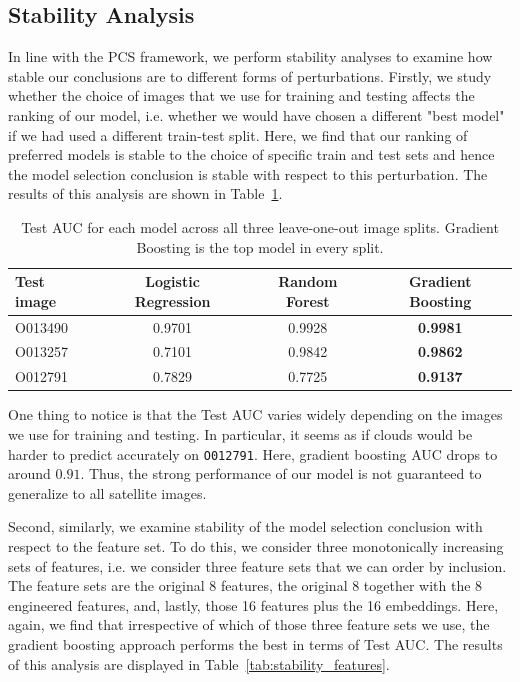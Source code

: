 \documentclass[10pt,letterpaper]{article}
\begin{document}
\subsection{Stability Analysis}

In line with the PCS framework, we perform stability analyses to examine how stable our conclusions are to different forms of perturbations. Firstly, we study whether the choice of images that we use for training and testing affects the ranking of our model, i.e. whether we would have chosen a different "best model" if we had used a different train-test split. Here, we find that our ranking of preferred models is stable to the choice of specific train and test sets and hence the model selection conclusion is stable with respect to this perturbation. The results of this analysis are shown in Table~\ref{tab:stability_loo}.

\begin{table}[htbp]
\centering
\small
\caption{Test AUC for each model across all three leave-one-out image splits. Gradient Boosting is the top model in every split.}
\label{tab:stability_loo}
\begin{tabular}{lccc}
\toprule
Test image & Logistic Regression & Random Forest & Gradient Boosting \\
\midrule
O013490 & 0.9701 & 0.9928 & \textbf{0.9981} \\
O013257 & 0.7101 & 0.9842 & \textbf{0.9862} \\
O012791 & 0.7829 & 0.7725 & \textbf{0.9137} \\
\bottomrule
\end{tabular}
\end{table}

One thing to notice is that the Test AUC varies widely depending on the images we use for training and testing. In particular, it seems as if clouds would be harder to predict accurately on \texttt{O012791}. Here, gradient boosting AUC drops to around $0.91$. Thus, the strong performance of our model is not guaranteed to generalize to all satellite images.

Second, similarly, we examine stability of the model selection conclusion with respect to the feature set. To do this, we consider three monotonically increasing sets of features, i.e. we consider three feature sets that we can order by inclusion. The feature sets are the original 8 features, the original 8 together with the 8 engineered features, and, lastly, those 16 features plus the 16 embeddings. Here, again, we find that irrespective of which of those three feature sets we use, the gradient boosting approach performs the best in terms of Test AUC. The results of this analysis are displayed in Table~\ref{tab:stability_features}.
\end{document}

